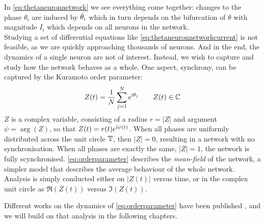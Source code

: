In \eqref{eq:thetaneuronnetwork} we see everything come together: changes to the phase $\theta_i$ are induced by ${\dot{\theta}}_i$ which in turn depends on the bifurcation of $\theta$ with magnitude $I_i$ which depends on all neurons in the network. \\


Studying a set of differential equations like \eqref{eq:thetaneuronnetworkcurrent} is not feasible, as we are quickly approaching thousands of neurons. And in the end, the dynamics of a single neuron are not of interest. Instead, we wish to capture and study how the network behaves as a whole. One aspect, synchrony, can be captured by the Kuramoto order parameter:
\begin{align}
Z(t) = \frac{1}{N} \sum_{j=1}^N e^{{\rm{i}}\theta_j}  \qquad Z(t) \in {\mathbb{C}} \label{eq:orderparameter}
\end{align}
$Z$ is a complex variable, consisting of a radius $r = \rvert Z \rvert$ and argument $\psi = \arg \left( Z \right)$, so that $Z(t) = r(t) e^{{\rm{i}} \psi(t)}$. When all phases are uniformly distributed across the unit circle ${\mathbb{T}}$, then $\rvert Z \rvert = 0$, resulting in a network with no synchronisation. When all phases are exactly the same, $\rvert Z \rvert = 1$, the network is fully scynchronised. \eqref{eq:orderparameter} describes the \textsl{mean-field} of the network, a simpler model that describes the average behaviour of the whole network. Analysis is simply conducted either on $ \rvert Z(t) \rvert$ versus time, or in the complex unit circle as $\Re (Z(t))$ versus $\Im (Z(t))$.

Different works on the dynamics of \eqref{eq:orderparameter} have been published \cite{Luke2013, Martens2020}, and we will build on that analysis in the following chapters.


